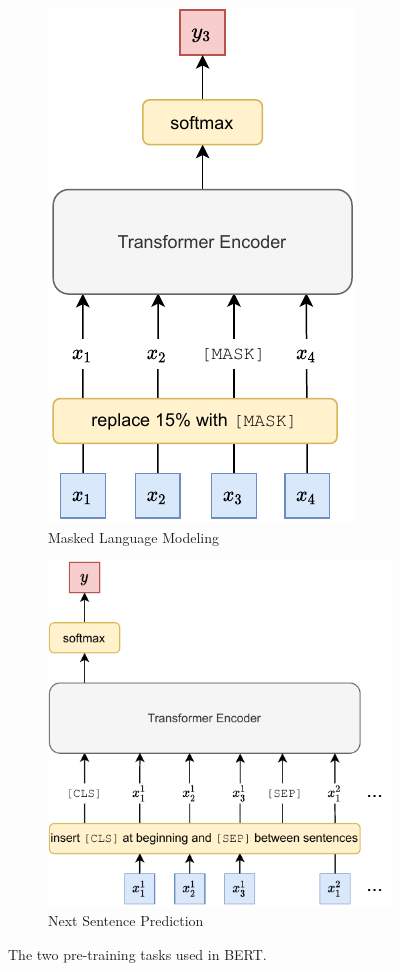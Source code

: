\documentclass[bsc,deptreport,ai]{infthesis} %
\begin{document}
\begin{figure}
\centering
\begin{subfigure}{0.49\textwidth}
\centering
\includegraphics[height=.9\textwidth]{MLM(2).pdf}
\caption{Masked Language Modeling}
\label{fig:mlm}
\end{subfigure}
\begin{subfigure}{0.49\textwidth}
\centering
\includegraphics[height=.9\textwidth]{NSP.pdf}
\caption{Next Sentence Prediction}
\label{fig:mlm}
\end{subfigure}
\caption{The two pre-training tasks used in BERT.}
\end{figure}
\end{document}
